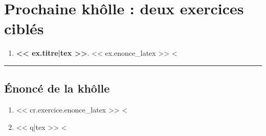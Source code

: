 \documentclass[11pt,a4paper]{article}
\begin{document}
\section*{Prochaine khôlle : deux exercices ciblés}
\begin{enumerate}
<%
  \item \textbf{<< ex.titre|tex >>}. << ex.enonce_latex >>
<%
\end{enumerate}

\bigskip\hrule\medskip
\subsection*{Énoncé de la khôlle}
\begin{enumerate}
  \item << cr.exercice.enonce_latex >>
<%
  \item << q|tex >>
<%
\end{enumerate}
\end{document}
